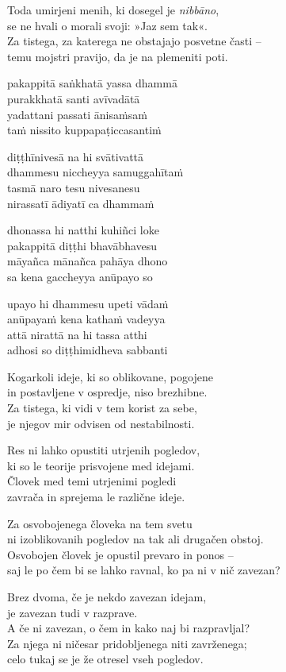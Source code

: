 Toda umirjeni menih, ki dosegel je \emph{nibbāno},\\
se ne hvali o morali svoji: »Jaz sem tak«.\\
Za tistega, za katerega ne obstajajo posvetne časti --\\
temu mojstri pravijo, da je na plemeniti poti.


\clearpage

pakappitā saṅkhatā yassa dhammā\\
purakkhatā santi avīvadātā\\
yadattani passati ānisaṁsaṁ\\
taṁ nissito kuppapaṭiccasantiṁ

diṭṭhīnivesā na hi svātivattā\\
dhammesu niccheyya samuggahītaṁ\\
tasmā naro tesu nivesanesu\\
nirassatī ādiyatī ca dhammaṁ

dhonassa hi natthi kuhiñci loke\\
pakappitā diṭṭhi bhavābhavesu\\
māyañca mānañca pahāya dhono\\
sa kena gaccheyya anūpayo so

upayo hi dhammesu upeti vādaṁ\\
anūpayaṁ kena kathaṁ vadeyya\\
attā nirattā na hi tassa atthi\\
adhosi so diṭṭhimidheva sabbanti


\clearpage

Kogarkoli ideje, ki so oblikovane, pogojene\\
in postavljene v ospredje, niso brezhibne.\\
Za tistega, ki vidi v tem korist za sebe,\\
je njegov mir odvisen od nestabilnosti.

Res ni lahko opustiti utrjenih pogledov,\\
ki so le teorije prisvojene med idejami.\\
Človek med temi utrjenimi pogledi\\
zavrača in sprejema le različne ideje.

Za osvobojenega človeka na tem svetu\\
ni izoblikovanih pogledov na tak ali drugačen obstoj.\\
Osvobojen človek je opustil prevaro in ponos --\\
saj le po čem bi se lahko ravnal, ko pa ni v nič zavezan?

Brez dvoma, če je nekdo zavezan idejam,\\\vin je zavezan tudi v razprave.\\
A če ni zavezan, o čem in kako naj bi razpravljal?\\
Za njega ni ničesar pridobljenega niti zavrženega;\\
celo tukaj se je že otresel vseh pogledov.

